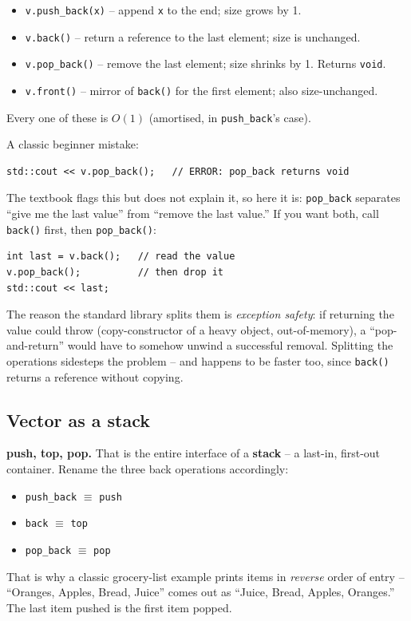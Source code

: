 \documentclass[11pt]{article}
\begin{document}
\begin{defnbox}
\begin{itemize}
    \item \texttt{v.push\_back(x)} -- append \texttt{x} to the end;
          size grows by 1.
    \item \texttt{v.back()} -- return a reference to the last element;
          size is unchanged.
    \item \texttt{v.pop\_back()} -- remove the last element; size
          shrinks by 1. Returns \texttt{void}.
    \item \texttt{v.front()} -- mirror of \texttt{back()} for the
          first element; also size-unchanged.
\end{itemize}
Every one of these is $O(1)$ (amortised, in \texttt{push\_back}'s
case).
\end{defnbox}

\begin{warnbox}
A classic beginner mistake:
\begin{lstlisting}
std::cout << v.pop_back();   // ERROR: pop_back returns void
\end{lstlisting}
The textbook flags this but does not explain it, so here it is:
\texttt{pop\_back} separates ``give me the last value'' from ``remove
the last value.'' If you want both, call \texttt{back()} first, then
\texttt{pop\_back()}:
\begin{lstlisting}
int last = v.back();   // read the value
v.pop_back();          // then drop it
std::cout << last;
\end{lstlisting}
The reason the standard library splits them is \emph{exception
safety}: if returning the value could throw (copy-constructor of a
heavy object, out-of-memory), a ``pop-and-return'' would have to
somehow unwind a successful removal. Splitting the operations
sidesteps the problem -- and happens to be faster too, since
\texttt{back()} returns a reference without copying.
\end{warnbox}

\subsection{Vector as a stack}

\begin{ideabox}
\textbf{push, top, pop.} That is the entire interface of a
\textbf{stack} -- a last-in, first-out container. Rename the three
back operations accordingly:
\begin{itemize}
    \item \texttt{push\_back} $\equiv$ \texttt{push}
    \item \texttt{back}      $\equiv$ \texttt{top}
    \item \texttt{pop\_back} $\equiv$ \texttt{pop}
\end{itemize}
That is why a classic grocery-list example prints items in
\emph{reverse} order of entry -- ``Oranges, Apples, Bread, Juice''
comes out as ``Juice, Bread, Apples, Oranges.'' The last item pushed
is the first item popped.
\end{ideabox}
\end{document}
